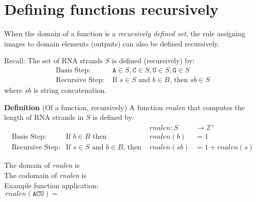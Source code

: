 \documentclass[12pt, oneside]{article}
\newcommand{\A}[0]{\texttt{A}}
\newcommand{\C}[0]{\texttt{C}}
\newcommand{\G}[0]{\texttt{G}}
\newcommand{\U}[0]{\texttt{U}}
\newcommand{\cmark}{\ding{51}}
\newcommand{\xmark}{\ding{55}}
\begin{document}
\vfill
\vfill

\newpage \vfill
\section*{Defining functions recursively}


When the domain of a function is a {\it recursively defined set}, the rule assigning 
images to domain elements (outputs) can also be defined recursively.

Recall: The set of RNA strands $S$ is defined (recursively) by:
\[
\begin{array}{ll}
\textrm{Basis Step: } & \A \in S, \C \in S, \U \in S, \G \in S \\
\textrm{Recursive Step: } & \textrm{If } s \in S\textrm{ and }b \in B \textrm{, then }sb \in S
\end{array}
\]
where $sb$ is string concatenation.

{\bf Definition} (Of a function, recursively) A function \textit{rnalen} that computes the length of RNA strands in $S$ is defined by:
\[
\begin{array}{llll}
& & \textit{rnalen} : S & \to \mathbb{Z}^+ \\
\textrm{Basis Step:} & \textrm{If } b \in B\textrm{ then } & \textit{rnalen}(b) & = 1 \\
\textrm{Recursive Step:} & \textrm{If } s \in S\textrm{ and }b \in B\textrm{, then  } & \textit{rnalen}(sb) & = 1 + \textit{rnalen}(s)
\end{array}
\]

The domain of \textit{rnalen} is \phantom{$S$}\\

The codomain of \textit{rnalen} is \\

Example function application:
\[
rnalen(\A\C\U) = \phantom{1+ rnalen(\A\C) = 1 + (1 + rnalen(\A) ) = 1 + ( 1 + 1) = 3}
\]
\end{document}
